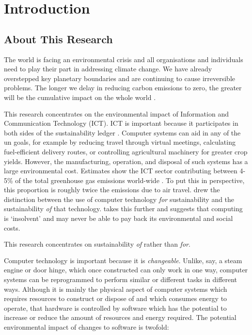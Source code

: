 \chapter{Introduction}
\label{chapter:introduction}

\section{About This Research}
\label{section:intro about}

The world is facing an environmental crisis and all organisations and individuals need to play their part in addressing climate change. We have already overstepped key planetary boundaries \citep{Steffen2015} and are continuing to cause irreversible problems. The longer we delay in reducing carbon emissions to zero, the greater will be the cumulative impact on the whole world \citep{Pierrehumbert2019}.

This research concentrates on the environmental impact of Information and Communication Technology (\gls{ICT}). ICT is important because it participates in both sides of the \gls{sustainability ledger} . Computer systems can aid in any of the \gls{un goals}, for example by reducing travel through virtual meetings, calculating fuel-efficient delivery routes, or controlling agricultural machinery for greater crop yields. However, the manufacturing, operation, and disposal of such systems has a large environmental cost. Estimates show the ICT sector contributing between 4-5\% of the total greenhouse gas emissions world-wide \citep{Belkhir2018}. To put this in perspective, this proportion is roughly twice the emissions due to air travel. \citet{Penzenstadler2013} drew the distinction between the use of computer technology \emph{for} sustainability and the sustainability \emph{of} that technology. \citep{Becker2023} takes this further and suggests that computing is `insolvent' and may never be able to pay back its environmental and social costs.

This research concentrates on sustainability \emph{of} rather than \emph{for}.

Computer technology is important because it is \emph{changeable}. Unlike, say, a steam engine or door hinge, which once constructed can only work in one way, computer systems can be reprogrammed to perform similar or different tasks in different ways. Although it is mainly the physical aspect of computer systems which requires resources to construct or dispose of and which consumes energy to operate, that hardware is controlled by software which has the potential to increase or reduce the amount of resources and energy required. The potential environmental impact of changes to software is twofold:

